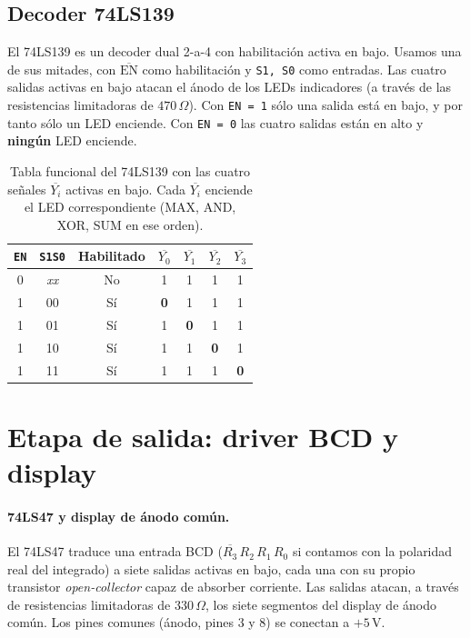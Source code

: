 \documentclass[a4paper,12pt]{article}
\begin{document}

\subsection{Decoder 74LS139}
El 74LS139 es un decoder dual 2-a-4 con habilitaci\'{o}n activa en
bajo. Usamos una de sus mitades, con \texttt{$\overline{\text{EN}}$}
como habilitaci\'{o}n y \texttt{S1, S0} como entradas. Las cuatro
salidas activas en bajo atacan el \'{a}nodo de los LEDs indicadores (a
trav\'{e}s de las resistencias limitadoras de $470\,\Omega$). Con
\texttt{EN = 1} s\'{o}lo una salida est\'{a} en bajo, y por tanto s\'{o}lo
un LED enciende. Con \texttt{EN = 0} las cuatro salidas est\'{a}n en
alto y \textbf{ning\'{u}n} LED enciende.

\begin{table}[H]
\centering
\small
\begin{tabular}{cc|c|cccc}
\toprule
\texttt{EN} & \texttt{S1S0} & Habilitado & $\overline{Y_0}$ & $\overline{Y_1}$ & $\overline{Y_2}$ & $\overline{Y_3}$ \\
\midrule
0 & \textit{xx} & No & 1 & 1 & 1 & 1 \\
1 & 00 & S\'{i} & \textbf{0} & 1 & 1 & 1 \\
1 & 01 & S\'{i} & 1 & \textbf{0} & 1 & 1 \\
1 & 10 & S\'{i} & 1 & 1 & \textbf{0} & 1 \\
1 & 11 & S\'{i} & 1 & 1 & 1 & \textbf{0} \\
\bottomrule
\end{tabular}
\caption{Tabla funcional del 74LS139 con las cuatro se\~{n}ales
$\overline{Y_i}$ activas en bajo. Cada $\overline{Y_i}$ enciende el LED
correspondiente (MAX, AND, XOR, SUM en ese orden).}
\end{table}

\section{Etapa de salida: driver BCD y display}

\paragraph{74LS47 y display de \'{a}nodo com\'{u}n.} El 74LS47 traduce
una entrada BCD ($\overline{R_3}\,R_2\,R_1\,R_0$ si contamos con la
polaridad real del integrado) a siete salidas activas en bajo, cada
una con su propio transistor \textit{open-collector} capaz de absorber
corriente. Las salidas atacan, a trav\'{e}s de resistencias limitadoras
de $330\,\Omega$, los siete segmentos del display de \'{a}nodo com\'{u}n.
Los pines comunes (\'{a}nodo, pines 3 y 8) se conectan a $+5\,\mathrm{V}$.
\end{document}
